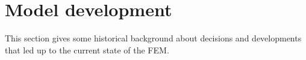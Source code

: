 \section{Model development}

This section gives some historical background about decisions and developments 
that led up to the current state of the FEM.





